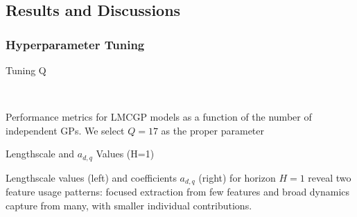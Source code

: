 \subsection{Results and Discussions}

\subsubsection{Hyperparameter Tuning}

\begin{frame}{Tuning Q}
	\begin{figure}[htbp]
	\centering
	\setlength{} 
	\setlength{}
	
	\subfloat[CRPS]{}\hspace{0.1em}
	\subfloat[MSE]{}\\
	\vspace{0.1em} %
	
	\subfloat[MSLL]{}\hspace{0.1em}
	\subfloat[NLPD]{}
	\end{figure}
	\vspace{-1em}
	\begin{block}{}
		Performance metrics for LMCGP models as a function of the number of independent GPs. We select $Q=17$ as the proper parameter
	\end{block}
\end{frame}

\begin{frame}{Lengthscale and $a_{d,q}$ Values (H=1)}
	\begin{figure}[htbp]
		\centering
		\setlength{} 
		\setlength{}
		\subfloat[]{}\hspace{-0.8em}
		\subfloat[]{}
	\end{figure}
	\vspace{-2.0em}
	\begin{block}{}
		Lengthscale values (left) and coefficients $a_{d,q}$ (right) for horizon $H=1$ reveal two feature usage patterns: focused extraction from few features and broad dynamics capture from many, with smaller individual contributions.
	\end{block}
		
	
\end{frame}

